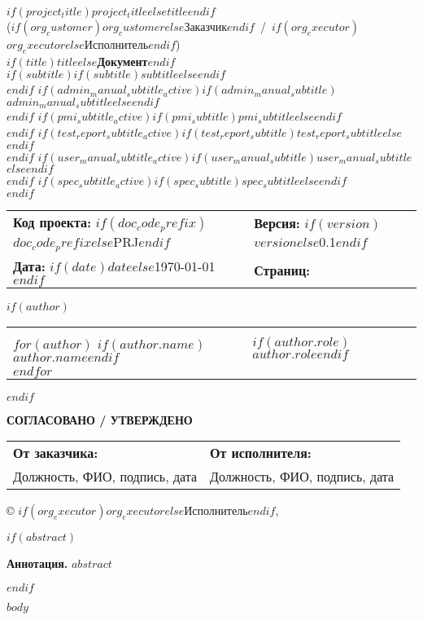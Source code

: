 \documentclass[12pt,a4paper]{article}
\makeatletter
\newcommand{\MetaTitle}{$if(title)$$title$$else$Документ$endif$}
\newcommand{\MetaSubtitle}{$if(subtitle)$$subtitle$$else$$endif$}
\newcommand{\MetaVersion}{$if(version)$$version$$else$0.1$endif$}
\newcommand{\MetaProjectTitle}{$if(project_title)$$project_title$$else$$title$$endif$}
\newcommand{\MetaOrgCustomer}{$if(org_customer)$$org_customer$$else$Заказчик$endif$}
\newcommand{\MetaOrgExecutor}{$if(org_executor)$$org_executor$$else$Исполнитель$endif$}
\newcommand{\MetaDocCodePrefix}{$if(doc_code_prefix)$$doc_code_prefix$$else$PRJ$endif$}
\newcommand{\MetaDate}{$if(date)$$date$$else$\today$endif$}
\newcommand{\MetaAManSubtitle}{$if(admin_manual_subtitle)$$admin_manual_subtitle$$else$$endif$}
\newcommand{\MetaPMISubtitle}{$if(pmi_subtitle)$$pmi_subtitle$$else$$endif$}
\newcommand{\MetaRepSubtitle}{$if(test_report_subtitle)$$test_report_subtitle$$else$$endif$}
\newcommand{\MetaUManSubtitle}{$if(user_manual_subtitle)$$user_manual_subtitle$$else$$endif$}
\newcommand{\MetaSpecSubtitle}{$if(spec_subtitle)$$spec_subtitle$$else$$endif$}
\def\maketitle{%
\begin{titlepage}
  \thispagestyle{empty}
  \begin{center}
    {\Large \textbf{\MetaProjectTitle}}\\[2mm]
    {\small (\MetaOrgCustomer\ /\ \MetaOrgExecutor)}\\[10mm]

    {\LARGE \textbf{\MetaTitle}}\\[1mm]
    $if(subtitle)$\MetaSubtitle\\[1mm]$endif$
    $if(admin_manual_subtitle_active)$\MetaAManSubtitle\\[1mm]$endif$
    $if(pmi_subtitle_active)$\MetaPMISubtitle\\[1mm]$endif$
    $if(test_report_subtitle_active)$\MetaRepSubtitle\\[1mm]$endif$
    $if(user_manual_subtitle_active)$\MetaUManSubtitle\\[1mm]$endif$
    $if(spec_subtitle_active)$\MetaSpecSubtitle\\[1mm]$endif$

    \vspace{8mm}

    \begin{tabularx}{\textwidth}{@{}>{\raggedright\arraybackslash}X >{\raggedleft\arraybackslash}X@{}}
      \textbf{Код проекта:} \MetaDocCodePrefix & \textbf{Версия:} \MetaVersion \\
      \textbf{Дата:} \MetaDate & \textbf{Страниц:} \pageref{LastPage} \\
    \end{tabularx}

    $if(author)$
    \vspace{6mm}
    {\small
    \begin{tabularx}{\textwidth}{@{}>{\raggedright\arraybackslash}X >{\raggedleft\arraybackslash}X@{}}
      \multicolumn{2}{@{}l@{}}{\textbf{Авторы / роли}}\\[1mm]
      $for(author)$
      $if(author.name)$$author.name$$endif$ &
      $if(author.role)$$author.role$$endif$ \\
      $endfor$
    \end{tabularx}}
    $endif$

    \vfill

    \textbf{СОГЛАСОВАНО / УТВЕРЖДЕНО}\\[2mm]
    \begin{tabularx}{\textwidth}{@{}>{\raggedright\arraybackslash}X >{\raggedleft\arraybackslash}X@{}}
      \textbf{От заказчика:} \dotfill & \textbf{От исполнителя:} \dotfill \\
      Должность, ФИО, подпись, дата & Должность, ФИО, подпись, дата \\
    \end{tabularx}

    \vspace{10mm}
    {\small © \MetaOrgExecutor, \the\year}
  \end{center}
\end{titlepage}
}
\makeatother
\begin{document}
\maketitle

$if(abstract)$
\begin{flushleft}\textbf{Аннотация.} $abstract$\end{flushleft}
$endif$

\tableofcontents
\newpage

$body$
\end{document}
